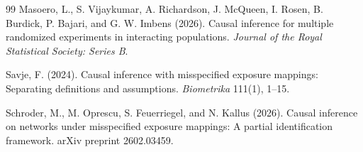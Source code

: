 \documentclass[11pt]{article}
\theoremstyle{definition}
\theoremstyle{plain}
\theoremstyle{remark}
\begin{document}
\begin{thebibliography}{99}
Masoero, L., S. Vijaykumar, A. Richardson, J. McQueen, I. Rosen, B. Burdick, P. Bajari, and G. W. Imbens (2026).
Causal inference for multiple randomized experiments in interacting populations.
\emph{Journal of the Royal Statistical Society: Series B}.

Savje, F. (2024).
Causal inference with misspecified exposure mappings: Separating definitions and assumptions.
\emph{Biometrika} 111(1), 1--15.

Schroder, M., M. Oprescu, S. Feuerriegel, and N. Kallus (2026).
Causal inference on networks under misspecified exposure mappings: A partial identification framework.
arXiv preprint 2602.03459.
\end{thebibliography}
\end{document}
